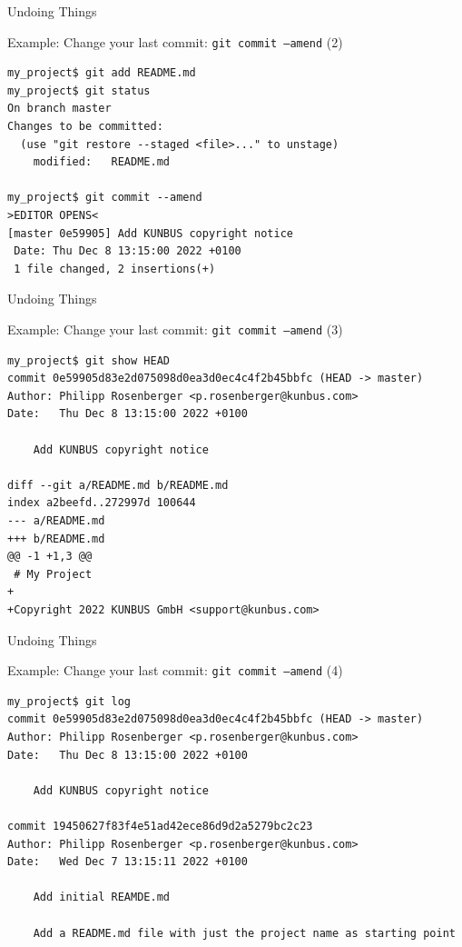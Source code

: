 \documentclass[aspectratio=169]{beamer}
\renewcommand{\footnotesize}{\tiny}
\newcommand{\sectiontitle}{}
\begin{document}
\begin{frame}[fragile]{Undoing Things}{\sectiontitle}
\begin{block}{Example: Change your last commit: \texttt{git commit --amend} {\small(2)}}
\begin{verbatim}
my_project$ git add README.md
my_project$ git status 
On branch master
Changes to be committed:
  (use "git restore --staged <file>..." to unstage)
    modified:   README.md

my_project$ git commit --amend
>EDITOR OPENS<
[master 0e59905] Add KUNBUS copyright notice
 Date: Thu Dec 8 13:15:00 2022 +0100
 1 file changed, 2 insertions(+)
\end{verbatim}
\end{block}
\end{frame}

\begin{frame}[fragile]{Undoing Things}{\sectiontitle}
\begin{block}{Example: Change your last commit: \texttt{git commit --amend} {\small(3)}}
\begin{verbatim}
my_project$ git show HEAD
commit 0e59905d83e2d075098d0ea3d0ec4c4f2b45bbfc (HEAD -> master)
Author: Philipp Rosenberger <p.rosenberger@kunbus.com>
Date:   Thu Dec 8 13:15:00 2022 +0100

    Add KUNBUS copyright notice

diff --git a/README.md b/README.md
index a2beefd..272997d 100644
--- a/README.md
+++ b/README.md
@@ -1 +1,3 @@
 # My Project
+
+Copyright 2022 KUNBUS GmbH <support@kunbus.com>
\end{verbatim}
\end{block}
\end{frame}

\begin{frame}[fragile]{Undoing Things}{\sectiontitle}
\begin{block}{Example: Change your last commit: \texttt{git commit --amend} {\small(4)}}
\begin{verbatim}
my_project$ git log
commit 0e59905d83e2d075098d0ea3d0ec4c4f2b45bbfc (HEAD -> master)
Author: Philipp Rosenberger <p.rosenberger@kunbus.com>
Date:   Thu Dec 8 13:15:00 2022 +0100

    Add KUNBUS copyright notice

commit 19450627f83f4e51ad42ece86d9d2a5279bc2c23
Author: Philipp Rosenberger <p.rosenberger@kunbus.com>
Date:   Wed Dec 7 13:15:11 2022 +0100

    Add initial REAMDE.md
    
    Add a README.md file with just the project name as starting point
\end{verbatim}
\end{block}
\end{frame}
\end{document}
